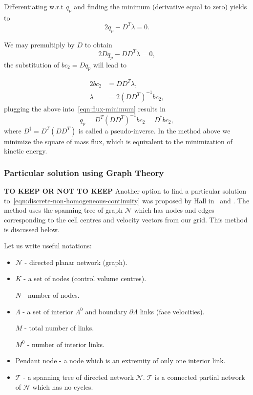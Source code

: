 \documentclass{article}
\begin{document}
Differentiating w.r.t $q_p$ and finding the minimum (derivative equal to zero) yields to
\begin{equation}\label{eqn:flux-minimum}
2 q_p-D^T \lambda=0.
\end{equation}

We may premultiply by $D$ to obtain
\begin{equation}
2 D q_p-D D^T \lambda=0,
\end{equation}
the substitution of $bc_2=D q_p$ will lead to

\begin{equation}
\begin{aligned}
2 bc_2&=D D^T \lambda,\\
\lambda &=2\left(D D^T\right)^{-1} bc_2,
\end{aligned}
\end{equation}
plugging the above into~\eqref{eqn:flux-minimum} results in
\begin{equation}
q_p=D^T\left(D D^T\right)^{-1} bc_2=D^\dagger bc_2,
\end{equation}
where $D^\dagger=D^T\left(D D^T\right)$ is called a pseudo-inverse. In the method above we minimize the square of mass flux, which is equivalent to the minimization of kinetic energy. 
 
\subsubsection{Particular solution using Graph Theory}\label{subsubsec:particular-graph-theory}
\textbf{TO KEEP OR NOT TO KEEP}
Another option to find a particular solution to~\eqref{eqn:discrete-non-homogeneous-continuity} was proposed by Hall in~\cite{Hall:1980} and \cite{Hall:1985}. The method uses the spanning tree of graph $\mathcal{N}$ which has nodes and edges corresponding to the cell centres and velocity vectors from our grid. This method is discussed below.

Let us write useful notations:
\begin{itemize}
	\item $\mathcal{N}$ - directed planar network (graph). 
	\item $K$ - a set of nodes (control volume centres). 
	
	$N$ - number of nodes. 
	\item $\Lambda$ - a set of interior $\Lambda^0$ and boundary $\partial \Lambda$ links (face velocities). 
		
		$M$ - total number of links.
		
		$M^0$ - number of interior links. 
	\item Pendant node - a node which is an extremity of only one interior link.  
	\item $\mathcal{T}$ - a spanning tree of directed network $\mathcal{N}$. $\mathcal{T}$ is a connected partial network of $\mathcal{N}$ which has no cycles.
\end{itemize}
\end{document}
